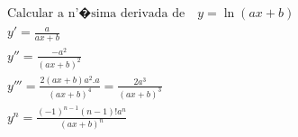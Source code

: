\begin{ex}
\begin{align}
&\text{Calcular a n'�sima derivada de}\quad y=\ln{(ax+b)}\nonumber\\
&y'=\frac{a}{ax+b}\nonumber\\
&y''=\frac{-a^2}{(ax+b)^2}\nonumber\\
&y'''=\frac{2(ax+b)a^2.a}{(ax+b)^4}=\frac{2a^3}{(ax+b)^3}\nonumber\\
&y^{n}=\frac{(-1)^{n-1}(n-1)!a^{n}}{(ax+b)^{n}}\nonumber
\end{align}
\end{ex}